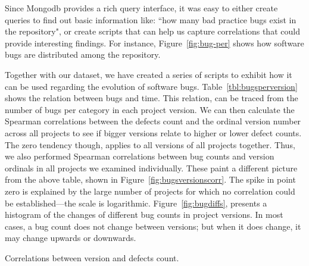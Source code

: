 \documentclass{sig-alternate}
\begin{document}
Since Mongo{\sc db} provides a rich query interface,
it was easy to either create
queries to find out basic information like:
``how many bad practice bugs exist in the repository", or
create scripts that can help us capture correlations
that could provide interesting findings. For instance,
Figure~\ref{fig:bug-per} shows how software 
bugs are distributed among the repository.

Together with our dataset, we have created a series of
scripts to exhibit how it can be used regarding
the evolution of software bugs.
Table~\ref{tbl:bugsperversion} shows the relation between
bugs and time. This relation, can be traced from the number of
bugs per category in each project version. We can then calculate the
Spearman correlations between the defects count and the ordinal
version number across all projects to see if bigger versions relate to
higher or lower defect counts.
The zero tendency though, applies to all versions of all projects together.
Thus, we also performed Spearman correlations between bug counts and version
ordinals in all projects we examined individually. These paint a different picture
from the above table, shown in Figure~\ref{fig:bugsversionscorr}. The
spike in point zero is explained by the large number of projects for
which no correlation could be established---the scale is
logarithmic.
Figure~\ref{fig:bugdiffs}, presents a histogram of the changes
of different bug counts in
project versions. In most cases, a bug count does not change between
versions; but when it does change, it may change upwards or downwards.

\begin{table}[tphp]
    \centering
    \caption{Correlations between version and defects count.}
    \label{tbl:bugsperversion}
    
\end{table}
\end{document}
